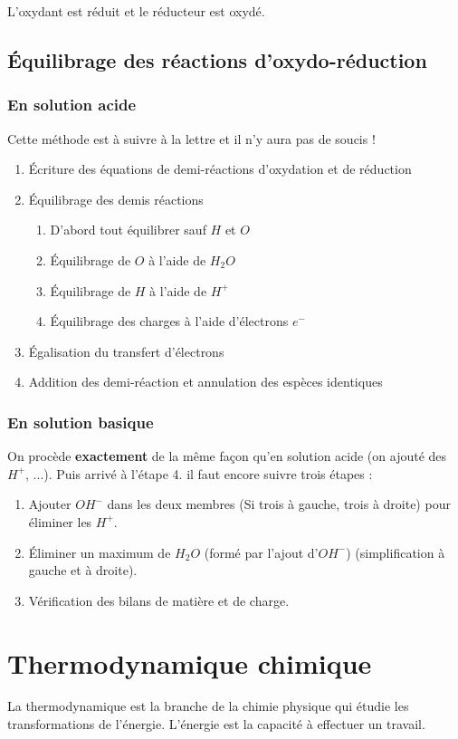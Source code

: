 \documentclass[british,french,11pt, a4paper, openany]{book}
\begin{document}
L'oxydant est réduit et le réducteur est oxydé.

\section{Équilibrage des réactions d'oxydo-réduction}
\subsection{En solution acide}
Cette méthode est à suivre à la lettre et il n'y aura pas de soucis ! 
\begin{enumerate}
	\item Écriture des équations de demi-réactions d'oxydation et de réduction
	\item Équilibrage des demis réactions
	      \begin{enumerate}
	      	\item D'abord tout équilibrer sauf $H$ et $O$
	      	\item Équilibrage de $O$ à l'aide de $H_2O$
	      	\item Équilibrage de $H$ à l'aide de $H^+$
	      	\item Équilibrage des charges à l'aide d'électrons $e^-$
	      \end{enumerate}
	\item Égalisation du transfert d'électrons
	\item Addition des demi-réaction et annulation des espèces identiques
\end{enumerate}

\subsection{En solution basique}
On procède \textbf{exactement} de la même façon qu'en solution acide (on ajouté des $H^+$, ...). Puis arrivé à l'étape 4. il faut encore suivre trois étapes : \\
\begin{enumerate}
	\item Ajouter $OH^-$ dans les deux membres (Si trois à gauche, trois à droite) pour éliminer les $H^+$.
	\item Éliminer un maximum de $H_2O$ (formé par l'ajout d'$OH^-$) (simplification à gauche et à droite).
	\item Vérification des bilans de matière et de charge.
\end{enumerate}

\newpage
\chapter{Thermodynamique chimique}
La thermodynamique est la branche de la chimie physique qui étudie les transformations de l'énergie. L'énergie est la capacité à effectuer un travail.
\end{document}

